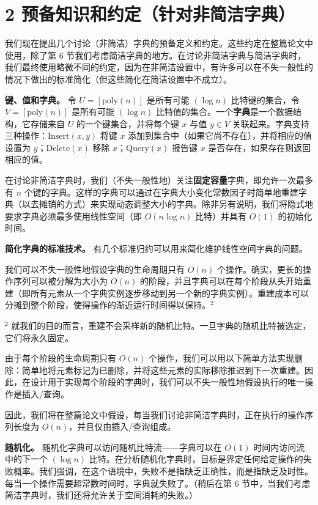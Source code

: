 \documentclass[12pt,a4paper]{ctexart}
\theoremstyle{remark}
\begin{document}
\medskip
\section{2 预备知识和约定（针对非简洁字典）}
我们现在提出几个讨论（非简洁）字典的预备定义和约定。这些约定在整篇论文中使用，除了第 6 节我们考虑简洁字典的地方。在讨论非简洁字典与简洁字典时，我们最终使用略微不同的约定，因为在非简洁设置中，有许多可以在不失一般性的情况下做出的标准简化（但这些简化在简洁设置中不成立）。

\textbf{键、值和字典。} 令 $U=[\text{poly}(n)]$ 是所有可能 $(\log n)$ 比特键的集合，令 $V=[\text{poly}(n)]$ 是所有可能 $(\log n)$ 比特值的集合。一个\textbf{字典}是一个数据结构，它存储来自 $U$ 的一个键集合，并将每个键 $x$ 与值 $y\in V$ 关联起来。字典支持三种操作：$\text{Insert}(x,y)$ 将键 $x$ 添加到集合中（如果它尚不存在），并将相应的值设置为 $y$；$\text{Delete}(x)$ 移除 $x$；$\text{Query}(x)$ 报告键 $x$ 是否存在，如果存在则返回相应的值。

在讨论非简洁字典时，我们（不失一般性地）关注\textbf{固定容量}字典，即允许一次最多有 $n$ 个键的字典。这样的字典可以通过在字典大小变化常数因子时简单地重建字典（以去摊销的方式）来实现动态调整大小的字典。除非另有说明，我们将隐式地要求字典必须最多使用线性空间（即 $O(n\log n)$ 比特）并具有 $O(1)$ 的初始化时间。

\textbf{简化字典的标准技术。} 有几个标准归约可以用来简化维护线性空间字典的问题。

我们可以不失一般性地假设字典的生命周期只有 $O(n)$ 个操作。确实，更长的操作序列可以被分解为大小为 $O(n)$ 的阶段，并且字典可以在每个阶段从头开始重建（即所有元素从一个字典实例逐步移动到另一个新的字典实例）。重建成本可以分摊到整个阶段，使得操作的渐近运行时间得以保持。$^2$

$^2$ 就我们的目的而言，重建不会采样新的随机比特。一旦字典的随机比特被选定，它们将永久固定。

由于每个阶段的生命周期只有 $O(n)$ 个操作，我们可以用以下简单方法实现删除：简单地将元素标记为已删除，并将这些元素的实际移除推迟到下一次重建。因此，在设计用于实现每个阶段的字典时，我们可以不失一般性地假设执行的唯一操作是插入/查询。

因此，我们将在整篇论文中假设，每当我们讨论非简洁字典时，正在执行的操作序列长度为 $O(n)$，并且仅由插入/查询组成。

\textbf{随机化。} 随机化字典可以访问随机比特流——字典可以在 $O(1)$ 时间内访问流中的下一个 $(\log n)$ 比特。在分析随机化字典时，目标是界定任何给定操作的失败概率。我们强调，在这个语境中，失败不是指缺乏正确性，而是指缺乏及时性。每当一个操作需要超常数时间时，字典就失败了。（稍后在第 6 节中，当我们考虑简洁字典时，我们还将允许关于空间消耗的失败。）
\end{document}
